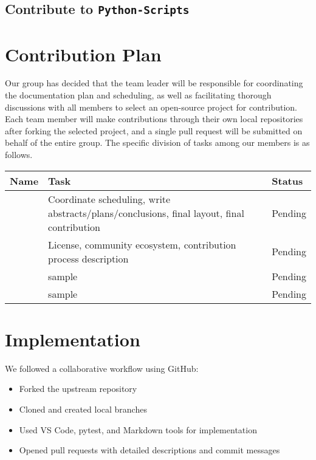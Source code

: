 \documentclass[12pt]{article}
\begin{document}
\subsection{Contribute to \texttt{Python-Scripts}}


\section{Contribution Plan}

Our group has decided that the team leader will be responsible for coordinating the documentation plan and scheduling, as well as facilitating thorough discussions with all members to select an open-source project for contribution. Each team member will make contributions through their own local repositories after forking the selected project, and a single pull request will be submitted on behalf of the entire group. The specific division of tasks among our members is as follows.

\begin{longtable}{|p{3cm}|p{7cm}|p{3cm}|}
\hline
\textbf{Name} & \textbf{Task} & \textbf{Status} \\
\hline
 & Coordinate scheduling, write abstracts/plans/conclusions, final layout, final contribution & Pending \\
\hline
 & License, community ecosystem, contribution process description & Pending \\
\hline
 & sample & Pending \\
\hline
 & sample & Pending \\
\hline
\end{longtable}

\section{Implementation}

We followed a collaborative workflow using GitHub:

\begin{itemize}
    \item Forked the upstream repository
    \item Cloned and created local branches
    \item Used VS Code, pytest, and Markdown tools for implementation
    \item Opened pull requests with detailed descriptions and commit messages
\end{itemize}
\end{document}
